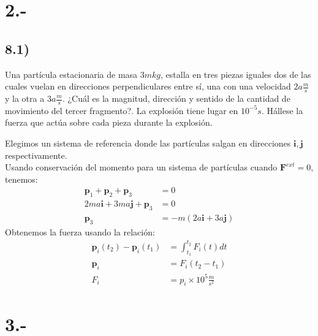 \documentclass{article}
\begin{document}
\section*{2.-}  
\subsection*{8.1)}
Una partícula estacionaria de masa $3m kg$, estalla en tres piezas iguales dos de las cuales
vuelan en direcciones perpendiculares entre sí, una con una velocidad $2a \frac{m}{s}$ y la
otra a $3a\frac{m}{s}$. ¿Cuál es la magnitud, dirección y sentido de la cantidad de movimiento 
del tercer fragmento?. La explosión tiene lugar en $10^{-5}s$. Hállese la fuerza que actúa sobre 
cada pieza durante la explosión.
\begin{tcolorbox}[breakable]
    Elegimos un sistema de referencia donde las partículas salgan en direcciones $\bm{i},\bm{j}$ respectivamente. \\
    Usando conservación del momento para un sistema de partículas cuando $\bm{F}^{ext} = 0$, tenemos:
    \begin{align*}
        \bm{p}_1 + \bm{p}_2 + \bm{p}_3 &= 0 \\
        2ma \bm{i} + 3ma \bm{j} + \bm{p}_3 &= 0 \\
        \bm{p}_3 &= -m(2a\bm{i} + 3a \bm{j})
    \end{align*}
    Obtenemos la fuerza usando la relación:
    \begin{align*}
        \bm{p}_i(t_2) - \bm{p}_i(t_1) &= \int_{t_1}^{t_2} F_i(t)dt \\
        \bm{p}_i &= F_i(t_2-t_1) \\
        F_i &= p_i \times 10^5 \tfrac{m}{s^2}
    \end{align*}
\end{tcolorbox}

\section*{3.-}
\end{document}

